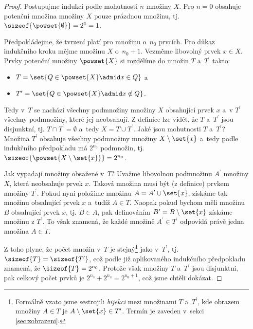 \begin{proof}
    Postupujme indukcí podle mohutnosti $n$ množiny $X$. Pro $n=0$ obsahuje potenční množina množiny $X$ pouze prázdnou množinu, tj. $\sizeof{\powset{\emptyset}}=2^0=1$.\par
    Předpokládejme, že tvrzení platí pro množinu o~$n_0$ prvcích. Pro důkaz indukčního kroku mějme množinu $X$ o~$n_0+1$. Vezměme libovolný prvek $x \in X$. Prvky potenční množiny $\powset{X}$ si rozdělíme do množin $T$ a~$T^\prime$ takto:
    \begin{itemize}
        \item $T=\set{Q \in \powset{X} \admid x\in Q}$ a
        \item $T^\prime=\set{Q \in \powset{X} \admid x\notin Q}$.
    \end{itemize}
    Tedy v~$T$ se nachází všechny podmnožiny množiny $X$ obsahující prvek $x$ a~v $T^\prime$ všechny podmnožiny, které jej neobsahují. Z definice lze vidět, že $T$ a~$T^\prime$ jsou disjunktní, tj. $T \cap T^\prime=\emptyset$ a~tedy $X=T\cup T^\prime$. Jaké jsou mohutnosti $T$ a~$T^\prime$? Množina $T^\prime$ obsahuje všechny podmnožiny množiny $X\setminus\set{x}$ a~tedy podle indukčního předpokladu má $2^{n_0}$ podmnožin, tj. $\sizeof{\powset{X\setminus\set{x}}}=2^{n_0}$.\par
    Jak vypadají množiny obsažené v~$T$? Uvažme libovolnou podmnožinu $A^\prime$ množiny $X$, která neobsahuje prvek $x$. Taková množina musí být (z definice) prvkem množiny $T^\prime$. Pokud nyní položíme množinu $A=A^\prime\cup \set{x}$, získáme tak množinu obsahující prvek $x$ a~tudíž $A\in T$. Naopak pokud bychom měli množinu $B$ obsahující prvek $x$, tj. $B\in A$, pak definováním $B^\prime=B\setminus \set{x}$ získáme množinu z $T^\prime$. To však znamená, že každé množině $A^\prime\in T^\prime$ odpovídá právě jedna množina $A\in T$.\par
    Z toho plyne, že počet množin v~$T$ je stejný\footnote{Formálně vzato jsme sestrojili \emph{bijekci} mezi množinami $T$ a~$T^\prime$, kde obrazem množiny $A\in T$ je $A\setminus \set{x}\in T^\prime$. Termín je zaveden v~sekci \ref{sec:zobrazeni}.} jako v~$T^\prime$, tj. $\sizeof{T}=\sizeof{T^\prime}$, což podle již aplikovaného indukčního předpokladu znamená, že $\sizeof{T}=2^{n_0}$. Protože však množiny $T$ a~$T^\prime$ jsou disjunktní, pak celkový počet prvků je $2^{n_0}+2^{n_0}=2^{n_0+1}$, což jsme chtěli dokázat.
\end{proof}